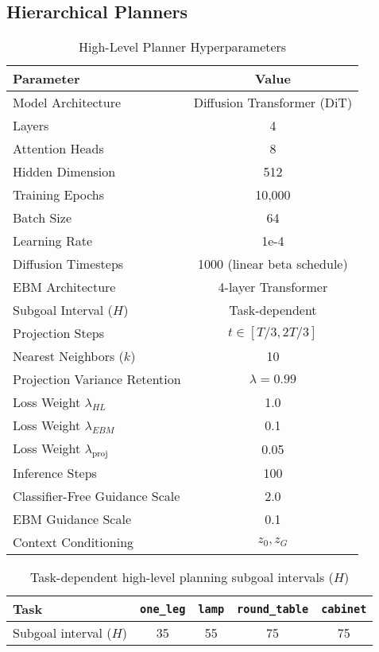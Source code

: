 \documentclass{article} %
\begin{document}
\subsection{Hierarchical Planners}
\label{app:hl_planner}
\begin{table}[htp]
    \centering
    \label{tab:high_level_planner_hyperparameters}
    \begin{tabular}{lc}
        \toprule
        \textbf{Parameter} & \textbf{Value} \\
        \midrule
        Model Architecture & Diffusion Transformer (DiT) \\
        Layers & 4 \\
        Attention Heads & 8 \\
        Hidden Dimension & 512 \\
        Training Epochs & 10,000 \\
        Batch Size & 64 \\
        Learning Rate & 1e-4 \\
        Diffusion Timesteps & 1000 (linear beta schedule) \\
        EBM Architecture & 4-layer Transformer \\
        Subgoal Interval ($H$) & Task-dependent \\
        Projection Steps & $t \in [T/3, 2T/3]$ \\
        Nearest Neighbors ($k$) & 10 \\
        Projection Variance Retention & $\lambda=0.99$ \\
        Loss Weight $\lambda_{HL}$ & 1.0 \\
        Loss Weight $\lambda_{EBM}$ & 0.1 \\
        Loss Weight $\lambda_{\text{proj}}$ & 0.05 \\
        Inference Steps & 100 \\
        Classifier-Free Guidance Scale & 2.0 \\
        EBM Guidance Scale & 0.1 \\
        Context Conditioning & $z_0, z_G$ \\
        \bottomrule
    \end{tabular}
    \caption{High-Level Planner Hyperparameters}
\end{table}

\begin{table}[htp]
    \centering
    \begin{tabular}{l|c|c|c|c}
        \toprule
        \textbf{Task} & \texttt{one\_leg} & \texttt{lamp} & \texttt{round\_table} & \texttt{cabinet} \\
        \midrule
        Subgoal interval ($H$) & 35 & 55 & 75 & 75 \\
        \bottomrule
    \end{tabular}
    \vspace{4pt}
    \caption{Task-dependent high-level planning subgoal intervals ($H$)}
    \label{tab:subgoal}
\end{table}
\end{document}
